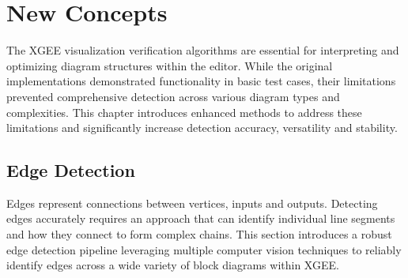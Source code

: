 \chapter{New Concepts}
\label{chp_new_concepts}
The XGEE visualization verification algorithms are essential for interpreting and optimizing diagram structures within the editor.
While the original implementations demonstrated functionality in basic test cases, their limitations prevented comprehensive detection across various diagram types and complexities. This chapter introduces enhanced methods to address these limitations and significantly increase detection accuracy, versatility and stability.
\section{Edge Detection}
\label{chp_edge_detection}
Edges represent connections between vertices, inputs and outputs. Detecting edges accurately requires an approach that can identify individual line segments and how they connect to form complex chains. This section introduces a robust edge detection pipeline leveraging multiple computer vision techniques to reliably identify edges across a wide variety of block diagrams within XGEE.

